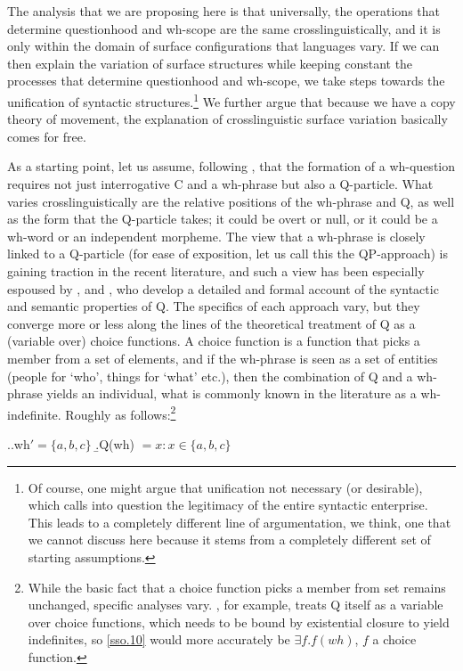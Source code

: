 \documentclass{glossa}
\begin{document}
The analysis that we are proposing here is that universally, the operations that determine questionhood and wh-scope are the same crosslinguistically, and it is only within the domain of surface configurations that languages vary. If we can then explain the variation of surface structures while keeping constant the processes that determine questionhood and wh-scope, we take steps towards the unification of syntactic structures.\footnote{Of course, one might argue that unification not necessary (or desirable), which calls into question the legitimacy of the entire syntactic enterprise. This leads to a completely different line of argumentation, we think, one that we cannot discuss here because it stems from a completely different set of starting assumptions.} We further argue that because we have a copy theory of movement, the explanation of crosslinguistic surface variation basically comes for free.

As a starting point, let us assume, following \cite{cable:2007}, that the formation of a wh-question requires not just interrogative C and a wh-phrase but also a Q-particle. What varies crosslinguistically are the relative positions of the wh-phrase and Q, as well as the form that the Q-particle takes; it could be overt or null, or it could be a wh-word or an independent morpheme. The view that a wh-phrase is closely linked to a Q-particle (for ease of exposition, let us call this the QP-approach) is gaining traction in the recent literature, and such a view has been especially espoused by \cite{hagstrom:1998}, \cite{cable:2007} and \cite{slade:2011}, who develop a detailed and formal account of the syntactic and semantic properties of Q. The specifics of each approach vary, but they converge more or less along the lines of the theoretical treatment of Q as a (variable over) choice functions. A choice function is a function that picks a member from a set of elements, and if the wh-phrase is seen as a set of entities (people for `who', things for `what' etc.), then the combination of Q and a wh-phrase yields an individual, what is commonly known in the literature as a wh-indefinite. Roughly as follows:\footnote{While the basic fact that a choice function picks a member from set remains unchanged, specific analyses vary. \cite{cable:2007}, for example, treats Q itself as a variable over choice functions, which needs to be bound by existential closure to yield indefinites, so \ref{sso.10} would more accurately be $\exists f.f(wh)$, $f$ a choice function.}

\ex.\label{sso.10}\a.wh$' = \{a,b,c\}$
   \b.Q(wh) $= x: x \in \{a,b,c\}$
\end{document}
